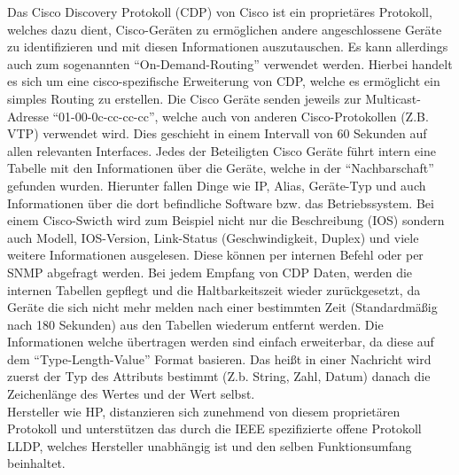 Das Cisco Discovery Protokoll (CDP) von Cisco ist ein proprietäres Protokoll, welches dazu dient, Cisco-Geräten zu ermöglichen andere angeschlossene Geräte zu identifizieren und mit diesen Informationen auszutauschen. Es kann allerdings auch zum sogenannten “On-Demand-Routing” verwendet werden. Hierbei handelt es sich um eine cisco-spezifische Erweiterung von CDP, welche es ermöglicht ein simples Routing zu erstellen.
Die Cisco Geräte senden jeweils zur Multicast-Adresse “01-00-0c-cc-cc-cc”, welche auch von anderen Cisco-Protokollen (Z.B. VTP) verwendet wird. Dies geschieht in einem Intervall von 60 Sekunden auf allen relevanten Interfaces. Jedes der Beteiligten Cisco Geräte führt intern eine Tabelle mit den Informationen über die Geräte, welche in der “Nachbarschaft” gefunden wurden. Hierunter fallen Dinge wie IP, Alias, Geräte-Typ und auch Informationen über die dort befindliche Software bzw. das Betriebssystem.
Bei einem Cisco-Swicth wird zum Beispiel nicht nur die Beschreibung (IOS) sondern auch Modell, IOS-Version, Link-Status (Geschwindigkeit, Duplex) und viele weitere Informationen ausgelesen.
Diese können per internen Befehl oder per SNMP abgefragt werden. Bei jedem Empfang von CDP Daten, werden die internen Tabellen gepflegt und die Haltbarkeitszeit wieder zurückgesetzt, da Geräte die sich nicht mehr melden nach einer bestimmten Zeit (Standardmäßig nach 180 Sekunden) aus den Tabellen wiederum entfernt werden. Die Informationen welche übertragen werden sind einfach erweiterbar, da diese auf dem “Type-Length-Value” Format basieren. Das heißt in einer Nachricht wird zuerst der Typ des Attributs bestimmt (Z.b. String, Zahl, Datum) danach die Zeichenlänge des Wertes und der Wert selbst.\\
Hersteller wie HP, distanzieren sich zunehmend von diesem proprietären Protokoll und unterstützen das durch die IEEE spezifizierte offene Protokoll LLDP, welches Hersteller unabhängig ist und den selben Funktionsumfang beinhaltet.